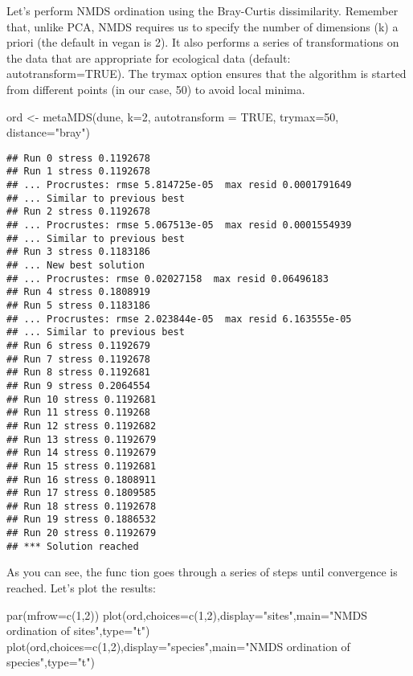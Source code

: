 \documentclass[
]{book}
\newenvironment{Shaded}{\begin{snugshade}}{\end{snugshade}}
\newcommand{\AttributeTok}[1]{\textcolor[rgb]{0.77,0.63,0.00}{#1}}
\newcommand{\ConstantTok}[1]{\textcolor[rgb]{0.00,0.00,0.00}{#1}}
\newcommand{\DecValTok}[1]{\textcolor[rgb]{0.00,0.00,0.81}{#1}}
\newcommand{\FunctionTok}[1]{\textcolor[rgb]{0.00,0.00,0.00}{#1}}
\newcommand{\NormalTok}[1]{#1}
\newcommand{\OtherTok}[1]{\textcolor[rgb]{0.56,0.35,0.01}{#1}}
\newcommand{\StringTok}[1]{\textcolor[rgb]{0.31,0.60,0.02}{#1}}
\begin{document}
Let's perform NMDS ordination using the Bray-Curtis dissimilarity. Remember that, unlike PCA, NMDS requires us to specify the number of dimensions (k) a priori (the default in vegan is 2). It also performs a series of transformations on the data that are appropriate for ecological data (default: autotransform=TRUE). The trymax option ensures that the algorithm is started from different points (in our case, 50) to avoid local minima.

\begin{Shaded}
\begin{Highlighting}[]
\NormalTok{ord }\OtherTok{\textless{}{-}} \FunctionTok{metaMDS}\NormalTok{(dune, }\AttributeTok{k=}\DecValTok{2}\NormalTok{, }\AttributeTok{autotransform =} \ConstantTok{TRUE}\NormalTok{, }\AttributeTok{trymax=}\DecValTok{50}\NormalTok{, }\AttributeTok{distance=}\StringTok{"bray"}\NormalTok{)}
\end{Highlighting}
\end{Shaded}

\begin{verbatim}
## Run 0 stress 0.1192678 
## Run 1 stress 0.1192678 
## ... Procrustes: rmse 5.814725e-05  max resid 0.0001791649 
## ... Similar to previous best
## Run 2 stress 0.1192678 
## ... Procrustes: rmse 5.067513e-05  max resid 0.0001554939 
## ... Similar to previous best
## Run 3 stress 0.1183186 
## ... New best solution
## ... Procrustes: rmse 0.02027158  max resid 0.06496183 
## Run 4 stress 0.1808919 
## Run 5 stress 0.1183186 
## ... Procrustes: rmse 2.023844e-05  max resid 6.163555e-05 
## ... Similar to previous best
## Run 6 stress 0.1192679 
## Run 7 stress 0.1192678 
## Run 8 stress 0.1192681 
## Run 9 stress 0.2064554 
## Run 10 stress 0.1192681 
## Run 11 stress 0.119268 
## Run 12 stress 0.1192682 
## Run 13 stress 0.1192679 
## Run 14 stress 0.1192679 
## Run 15 stress 0.1192681 
## Run 16 stress 0.1808911 
## Run 17 stress 0.1809585 
## Run 18 stress 0.1192678 
## Run 19 stress 0.1886532 
## Run 20 stress 0.1192679 
## *** Solution reached
\end{verbatim}

As you can see, the func tion goes through a series of steps until convergence is reached. Let's plot the results:

\begin{Shaded}
\begin{Highlighting}[]
\FunctionTok{par}\NormalTok{(}\AttributeTok{mfrow=}\FunctionTok{c}\NormalTok{(}\DecValTok{1}\NormalTok{,}\DecValTok{2}\NormalTok{))}
\FunctionTok{plot}\NormalTok{(ord,}\AttributeTok{choices=}\FunctionTok{c}\NormalTok{(}\DecValTok{1}\NormalTok{,}\DecValTok{2}\NormalTok{),}\AttributeTok{display=}\StringTok{"sites"}\NormalTok{,}\AttributeTok{main=}\StringTok{"NMDS ordination of sites"}\NormalTok{,}\AttributeTok{type=}\StringTok{"t"}\NormalTok{)}
\FunctionTok{plot}\NormalTok{(ord,}\AttributeTok{choices=}\FunctionTok{c}\NormalTok{(}\DecValTok{1}\NormalTok{,}\DecValTok{2}\NormalTok{),}\AttributeTok{display=}\StringTok{"species"}\NormalTok{,}\AttributeTok{main=}\StringTok{"NMDS ordination of species"}\NormalTok{,}\AttributeTok{type=}\StringTok{"t"}\NormalTok{)}
\end{Highlighting}
\end{Shaded}
\end{document}
